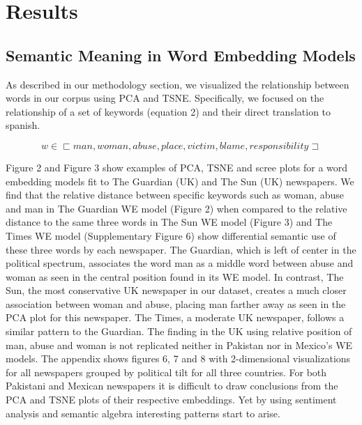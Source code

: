 \documentclass{article}
\begin{document}
\section{Results}{	
\subsection{Semantic Meaning in Word Embedding Models}{
	
As described in our methodology section, we visualized the relationship between words in our corpus using PCA and TSNE. Specifically, we focused on the relationship of a set of keywords (equation 2) and their direct translation to spanish. 

\begin{equation} \label{eu_eqn}
	w \in \sqsubset  {man, woman, abuse, place, victim, blame, responsibility} \sqsupset
\end{equation}

Figure 2 and Figure 3 show examples of PCA, TSNE and scree plots for a word embedding models fit to The Guardian (UK) and The Sun (UK) newspapers. We find that the relative distance between specific keywords such as woman, abuse and man in The Guardian WE model (Figure 2) when compared to the relative distance to the same three words in The Sun WE model (Figure 3) and The Times WE model (Supplementary Figure 6) show differential semantic use of these three words by each newspaper. The Guardian, which is left of center in the political spectrum, associates the word man as a middle word between abuse and woman as seen in the central position found in its WE model. In contrast, The Sun, the most conservative  UK newspaper in our dataset, creates a much closer association between woman and abuse, placing man farther away as seen in the PCA plot for this newspaper. The Times, a moderate UK newspaper, follows a similar pattern to the Guardian. The finding in the UK using relative position of man, abuse and woman is not replicated neither in Pakistan nor in Mexico’s WE models. The appendix shows figures 6, 7 and 8 with 2-dimensional visualizations for all newspapers grouped by political tilt for all three countries. For both Pakistani and Mexican newspapers it is difficult to draw conclusions from the PCA and TSNE plots of their respective embeddings. Yet by using sentiment analysis and semantic algebra interesting patterns start to arise. 

}}
\end{document}
